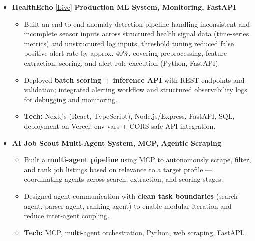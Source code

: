 \documentclass[letterpaper,11pt]{article}
\begin{document}
\begin{itemize}[leftmargin=0.0in, label={}]
\item \small \textbf{HealthEcho} \href{https://healthecho.vercel.app/}{\small [Live]} \hfill \small \textbf{Production ML System, Monitoring, FastAPI}
\vspace{-9pt}
\begin{itemize}[leftmargin=0.4cm]
\item \small Built an end-to-end {anomaly detection pipeline} handling {inconsistent and incomplete sensor inputs} across structured health signal data (time-series metrics) and unstructured log inputs; threshold tuning reduced false positive alert rate by approx. 40\%, covering preprocessing, feature extraction, scoring, and alert rule execution (Python, FastAPI).
\vspace{-3.5pt}
\item \small Deployed \textbf{batch scoring + inference API} with REST endpoints and validation; integrated alerting workflow and structured observability logs for debugging and monitoring.
\vspace{-3.5pt}
\item \small \textbf{Tech:} Next.js (React, TypeScript), Node.js/Express, FastAPI, SQL, deployment on Vercel; env vars + CORS-safe API integration.
\vspace{-3.5pt}
\end{itemize}
\vspace{-10pt}

\item \small \textbf{AI Job Scout} \hfill \small \textbf{Multi-Agent System, MCP, Agentic Scraping}
\vspace{-9pt}
\begin{itemize}[leftmargin=0.4cm]
\item \small Built a \textbf{multi-agent pipeline} using MCP to autonomously scrape, filter, and rank job listings based on relevance to a target profile --- coordinating agents across search, extraction, and scoring stages.
\vspace{-3.5pt}
\item \small Designed agent communication with \textbf{clean task boundaries} (search agent, parser agent, ranking agent) to enable modular iteration and reduce inter-agent coupling.
\vspace{-3.5pt}
\item \small \textbf{Tech:} MCP, multi-agent orchestration, Python, web scraping, FastAPI.
\vspace{-3.5pt}
\end{itemize}
\vspace{-10pt}

\end{itemize}
\end{document}
